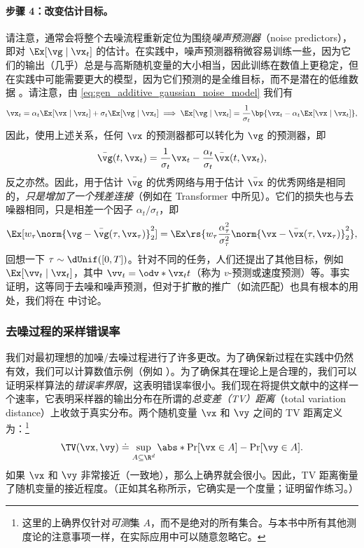 \documentclass[../../book-main_zh.tex]{subfiles}
\begin{document}
\paragraph{步骤 4：改变估计目标。} 请注意，通常会将整个去噪流程重新定位为围绕\textit{噪声预测器}（noise predictors），即对 \(\Ex[\vg \mid
\vx_{t}]\) 的估计。在实践中，噪声预测器稍微容易训练一些，因为它们的输出（几乎）总是与高斯随机变量的大小相当，因此训练在数值上更稳定，但在实践中可能需要更大的模型，因为它们预测的是全维目标，而不是潜在的低维数据 \citep{li2025back}。请注意，由 \eqref{eq:gen_additive_gaussian_noise_model} 我们有
\begin{equation}
    \vx_{t} = \alpha_{t}\Ex[\vx \mid \vx_{t}] + \sigma_{t}\Ex[\vg
    \mid \vx_{t}] \implies \Ex[\vg \mid \vx_{t}] =
    \frac{1}{\sigma_{t}}\bp{\vx_{t} - \alpha_{t}\Ex[\vx \mid \vx_{t}]},
\end{equation}
因此，使用上述关系，任何 \(\vx\) 的预测器都可以转化为 \(\vg\) 的预测器，即
\begin{equation}
    \bar{\vg}(t, \vx_{t}) = \frac{1}{\sigma_{t}}\vx_{t} -
    \frac{\alpha_{t}}{\sigma_{t}}\bar{\vx}(t, \vx_{t}),
\end{equation}
反之亦然。因此，用于估计 \(\bar{\vg}\) 的优秀网络与用于估计 \(\bar{\vx}\) 的优秀网络是相同的，\textit{只是增加了一个残差连接}（例如在 Transformer 中所见）。它们的损失也与去噪器相同，只是相差一个因子 \(\alpha_{t}/\sigma_{t}\)，即
\begin{equation}
    \Ex[w_{\tau}\norm{\vg - \bar{\vg}(\tau,
    \vx_{\tau})}_{2}^{2}] =
    \Ex\rs{w_{\tau}\frac{\alpha_{\tau}^{2}}{\sigma_{\tau}^{2}}\norm{\vx
    - \bar{\vx}(\tau, \vx_{\tau})}_{2}^{2}},
\end{equation}
回想一下 \(\tau \sim \dUnif([0, T])\)。针对不同的任务，人们还提出了其他目标，例如 \(\Ex[\vv_{t} \mid
\vx_{t}]\)，其中 \(\vv_{t} = \odv*{\vx_{t}}{t}\)（称为 \(v\)-预测或速度预测）等。事实证明，这等同于去噪和噪声预测，但对于扩散的推广（如流匹配）也具有根本的用处，我们将在  中讨论。

\subsubsection{去噪过程的采样错误率}
我们对最初理想的加噪/去噪过程进行了许多更改。为了确保新过程在实践中仍然有效，我们可以计算数值示例（例如 ）。为了确保其在理论上是合理的，我们可以证明采样算法的\textit{错误率界限}，这表明错误率很小。我们现在将提供文献中的这样一个速率，它表明采样器的输出分布在所谓的\textit{总变差（TV）距离}（total variation distance）上收敛于真实分布。两个随机变量 \(\vx\) 和 \(\vy\) 之间的 TV 距离定义为：\footnote{这里的上确界仅针对\textit{可测}集 \(A\)，而不是绝对的所有集合。与本书中所有其他测度论的注意事项一样，在实际应用中可以随意忽略它。}
\begin{equation}
    \TV(\vx, \vy) \doteq \sup_{A \subseteq \R^{d}}\abs*{\Pr[\vx \in
    A] - \Pr[\vy \in A]}.
\end{equation}
如果 \(\vx\) 和 \(\vy\) 非常接近（一致地），那么上确界就会很小。因此，TV 距离衡量了随机变量的接近程度。（正如其名称所示，它确实是一个度量；证明留作练习。）
\end{document}
